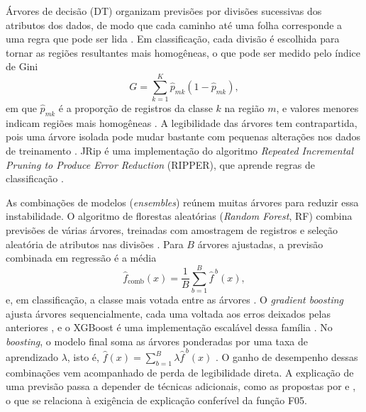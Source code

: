Árvores de decisão (DT) organizam previsões por divisões sucessivas dos atributos dos dados, de modo que cada caminho até uma folha corresponde a uma regra que pode ser lida \cite{James2021}. Em classificação, cada divisão é escolhida para tornar as regiões resultantes mais homogêneas, o que pode ser medido pelo índice de Gini
\begin{equation}
G = \sum_{k=1}^{K} \hat{p}_{mk}\left(1 - \hat{p}_{mk}\right),
\label{eq:gini}
\end{equation}
em que $\hat{p}_{mk}$ é a proporção de registros da classe $k$ na região $m$, e valores menores indicam regiões mais homogêneas \cite{James2021}. A legibilidade das árvores tem contrapartida, pois uma árvore isolada pode mudar bastante com pequenas alterações nos dados de treinamento \cite{James2021}. JRip é uma implementação do algoritmo \textit{Repeated Incremental Pruning to Produce Error Reduction} (RIPPER), que aprende regras de classificação \cite{WekaJRip}.

As combinações de modelos (\textit{ensembles}) reúnem muitas árvores para reduzir essa instabilidade. O algoritmo de florestas aleatórias (\textit{Random Forest}, RF) combina previsões de várias árvores, treinadas com amostragem de registros e seleção aleatória de atributos nas divisões \cite{Breiman2001}. Para $B$ árvores ajustadas, a previsão combinada em regressão é a média
\begin{equation}
\hat{f}_{\text{comb}}(x) = \frac{1}{B} \sum_{b=1}^{B} \hat{f}^{\,b}(x),
\label{eq:floresta}
\end{equation}
e, em classificação, a classe mais votada entre as árvores \cite{James2021}. O \textit{gradient boosting} ajusta árvores sequencialmente, cada uma voltada aos erros deixados pelas anteriores \cite{Friedman2001}, e o XGBoost é uma implementação escalável dessa família \cite{ChenGuestrin2016}. No \textit{boosting}, o modelo final soma as árvores ponderadas por uma taxa de aprendizado $\lambda$, isto é, $\hat{f}(x) = \sum_{b=1}^{B} \lambda \hat{f}^{\,b}(x)$ \cite{James2021}. O ganho de desempenho dessas combinações vem acompanhado de perda de legibilidade direta. A explicação de uma previsão passa a depender de técnicas adicionais, como as propostas por  e , o que se relaciona à exigência de explicação conferível da função F05.

